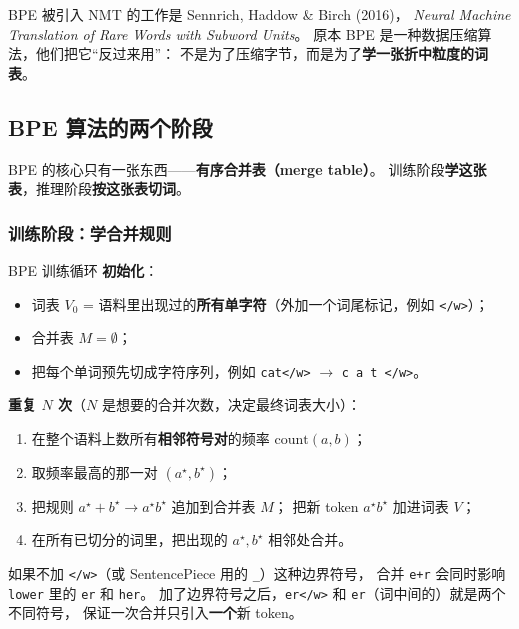 \begin{remark}
BPE 被引入 NMT 的工作是 Sennrich, Haddow \& Birch (2016)，
\emph{Neural Machine Translation of Rare Words with Subword Units}。
原本 BPE 是一种数据压缩算法，他们把它“反过来用”：
不是为了压缩字节，而是为了\textbf{学一张折中粒度的词表}。
\end{remark}

\subsection{BPE 算法的两个阶段}

BPE 的核心只有一张东西——\textbf{有序合并表（merge table）}。
训练阶段\textbf{学这张表}，推理阶段\textbf{按这张表切词}。

\subsubsection{训练阶段：学合并规则}

\begin{mathbox}{BPE 训练循环}
\textbf{初始化}：
\begin{itemize}
    \item 词表 $V_0$ = 语料里出现过的\textbf{所有单字符}（外加一个词尾标记，例如 \texttt{</w>}）；
    \item 合并表 $M = \emptyset$；
    \item 把每个单词预先切成字符序列，例如 \texttt{cat</w>} $\to$ \texttt{c\,a\,t\,</w>}。
\end{itemize}
\textbf{重复 $N$ 次}（$N$ 是想要的合并次数，决定最终词表大小）：
\begin{enumerate}
    \item 在整个语料上数所有\textbf{相邻符号对}的频率 $\mathrm{count}(a, b)$；
    \item 取频率最高的那一对 $(a^\star, b^\star)$；
    \item 把规则 $a^\star + b^\star \to a^\star b^\star$ 追加到合并表 $M$；
          把新 token $a^\star b^\star$ 加进词表 $V$；
    \item 在所有已切分的词里，把出现的 $a^\star, b^\star$ 相邻处合并。
\end{enumerate}
\end{mathbox}

\begin{remark}[为什么需要词尾标记]
如果不加 \texttt{</w>}（或 SentencePiece 用的 \texttt{\_}）这种边界符号，
合并 \texttt{e+r} 会同时影响 \texttt{lower} 里的 \texttt{er} 和 \texttt{her}。
加了边界符号之后，\texttt{er</w>} 和 \texttt{er}（词中间的）就是两个不同符号，
保证一次合并只引入\textbf{一个}新 token。
\end{remark}

